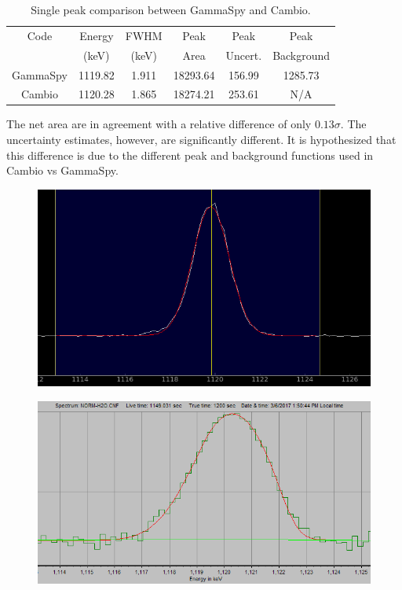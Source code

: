 \documentclass[10pt]{article}
\begin{document}
\begin{table}[h]
\begin{center}
\begin{tabular}{|c|c|c|c|c|c|}
\hline 
Code & Energy	&FWHM	&Peak	&Peak	&Peak \\
       & (keV)	&(keV)	&Area	&Uncert.	&Background\\ \hline \hline
 GammaSpy &1119.82	& 1.911	&18293.64 &156.99 & 1285.73 \\
 Cambio &1120.28	& 1.865	&18274.21 &253.61 & N/A \\
\hline
\end{tabular}
\caption{Single peak comparison between GammaSpy and Cambio.}
\end{center}
\label{table_1}
\end{table}

The net area are in agreement with a relative difference of only $0.13\sigma$.  The uncertainty
estimates, however, are significantly different.  It is hypothesized that this difference
is due to the different peak and background functions used in Cambio vs GammaSpy. \\

\begin{figure}[!htbp]
\centering
\begin{minipage}{.55\textwidth}
  \centering
  \includegraphics[width=.90\linewidth]{images/gspy_ex.png}
  \label{fig1}
\end{minipage}%
\begin{minipage}{.55\textwidth}
  \centering
  \includegraphics[width=.95\linewidth]{images/cambio_ex.png}
  \label{fig2}
\end{minipage}
\end{figure}
\end{document}
